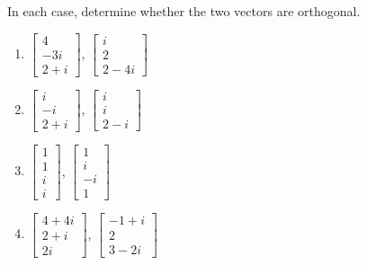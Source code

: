 \documentclass{ximera}
\begin{document}
\begin{problem}\label{prb:complex_matrices2}
In each case, determine whether the two vectors are orthogonal.

\begin{enumerate}
\item $\begin{bmatrix}
4\\ -3i\\ 2 + i\end{bmatrix}$, $\begin{bmatrix} i\\ 2\\ 2 - 4i\end{bmatrix}$
\item $\begin{bmatrix} i\\ -i\\ 2 + i \end{bmatrix}$, $\begin{bmatrix} i\\ i\\ 2 -i \end{bmatrix}$
\item $\begin{bmatrix} 1\\ 1\\ i\\ i\end{bmatrix}$, $\begin{bmatrix} 1\\ i\\ -i\\ 1\end{bmatrix}$
\item $\begin{bmatrix} 4 + 4i\\ 2 + i\\ 2i\end{bmatrix}$, $\begin{bmatrix} -1 + i\\ 2\\ 3 - 2i\end{bmatrix}$
\end{enumerate}

\end{problem}
\end{document}
